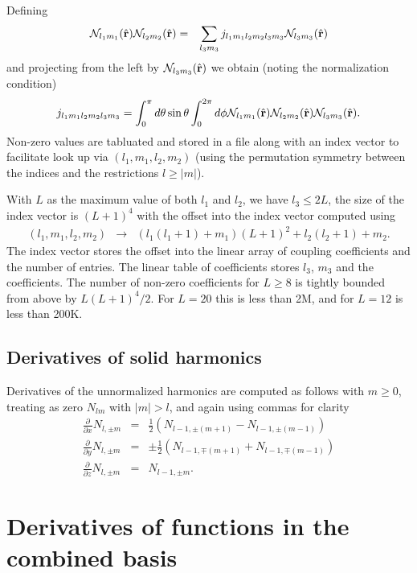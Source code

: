 \documentclass[12pt]{article}
\newcommand{\N}{\mathcal{N}}
\newcommand{\rv}{\vb{r}}
\newcommand{\rhat}{\hat{\rv}}
\begin{document}
Defining 
\begin{eqnarray}
  \N_{l_1 m_1}(\rhat) \N_{l_2 m_2}(\rhat) & = & \sum_{l_3 m_3} j_{l_1 m_1 l_2 m_2 l_3 m_3} \N_{l_3 m_3}(\rhat)
\end{eqnarray}
and projecting from the left by $\N_{l_3 m_3}(\rhat)$ we obtain (noting the normalization condition)
\begin{eqnarray}
  j_{l_1 m_1 l_2 m_2 l_3 m_3} = \int_0^\pi d\theta \sin \theta \int_0^{2 \pi} d\phi \N_{l_1 m_1}(\rhat) \N_{l_2 m_2}(\rhat) \N_{l_3 m_3}(\rhat) .
\end{eqnarray}
Non-zero values are tabluated and stored in a file along with an index vector to facilitate look up via $(l_1, m_1, l_2, m_2)$ (using the permutation symmetry between the indices and the restrictions $l \ge |m|$).

With $L$ as the maximum value of both $l_1$ and $l_2$, we have $l_3 \le 2 L$, the size of the index vector is $(L+1)^4$ with the offset into the index vector computed using
\begin{eqnarray}
  (l_1, m_1, l_2, m_2) & \rightarrow & (l_1 (l_1+1)+m_1) (L+1)^2 + l_2 (l_2+1)+m_2 .
\end{eqnarray}
The index vector stores the offset into the linear array of coupling coefficients and the number of entries.  The linear table of coefficients stores $l_3$, $m_3$ and the coefficients.
The number of non-zero coefficients for $L \ge 8$ is tightly bounded from above by $L (L+1)^4 / 2$. For $L=20$ this is less than 2M, and for $L=12$ is less than 200K.  

\subsection{Derivatives of solid harmonics}

Derivatives of the unnormalized harmonics are computed as follows with $m\ge 0$, treating as zero $N_{lm}$ with $|m|>l$, and again using commas for clarity
\begin{eqnarray}
  \frac{\partial}{\partial x} N_{l,\pm m} & = & \frac{1}{2}\left( N_{l-1,\pm (m+1)} - N_{l-1,\pm (m-1)} \right) \nonumber \\
  \frac{\partial}{\partial y} N_{l,\pm m} & = & \pm \frac{1}{2}\left( N_{l-1,\mp (m+1)} + N_{l-1,\mp (m-1)} \right) \nonumber \\
  \frac{\partial}{\partial z} N_{l,\pm m} & = & N_{l-1,\pm m} . \nonumber
\end{eqnarray}

\section{Derivatives of functions in the combined basis}
\end{document}
